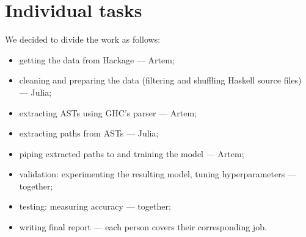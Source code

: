 \documentclass[12pt]{article}
\begin{document}
\section{Individual tasks}


We decided to divide the work as follows:

\begin{itemize}
    \item getting the data from Hackage — Artem;
    \item cleaning and preparing the data (filtering and shuffling Haskell source files) — Julia;
    \item extracting ASTs using GHC's parser — Artem;
    \item extracting paths from ASTs — Julia;
    \item piping extracted paths to \cv and training the model — Artem; %
    \item validation: experimenting the resulting model, tuning hyperparameters — together;
    \item testing: measuring accuracy --- together;
    \item writing final report --- each person covers their corresponding job.
\end{itemize}




\end{document}
